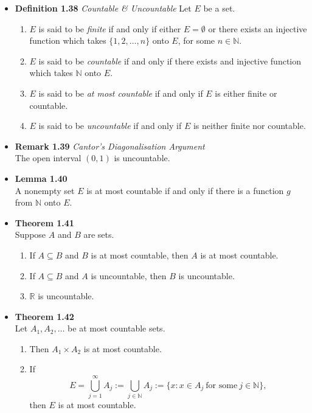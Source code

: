 \documentclass[11pt,a4paper]{article}
\begin{document}
\begin{itemize}
    \item \textbf{Definition 1.38} \emph{Countable & Uncountable}
        Let $E$ be a set.
        \begin{enumerate}
            \item $E$ is said to be \emph{finite} if and only if either $E = \emptyset$
                or there exists an injective function which takes
                $\{ 1, 2, \ldots, n \}$ onto $E$, for some $n \in \mathbb{N}$.
            \item $E$ is said to be \emph{countable} if and only if there exists and injective
                function which takes $\mathbb{N}$ onto $E$.
            \item $E$ is said to be \emph{at most countable} if and only if $E$ is either
                finite or countable.
            \item $E$ is said to be \emph{uncountable} if and only if $E$ is neither finite nor
                countable.
        \end{enumerate}

    \item \textbf{Remark 1.39} \emph{Cantor's Diagonalisation Argument} \\
        The open interval $(0, 1)$ is uncountable.

    \item \textbf{Lemma 1.40} \\
        A nonempty set $E$ is at most countable if and only if there is a function $g$ from
        $\mathbb{N}$ onto $E$.

    \item \textbf{Theorem 1.41} \\
        Suppose $A$ and $B$ are sets.
        \begin{enumerate}
            \item If $A \subseteq B$ and $B$ is at most countable, then $A$ is at most countable.
            \item If $A \subseteq B$ and $A$ is uncountable, then $B$ is uncountable.
            \item $\mathbb{R}$ is uncountable.
        \end{enumerate}

    \item \textbf{Theorem 1.42} \\
        Let $A_1, A_2, \ldots$ be at most countable sets.
        \begin{enumerate}
            \item Then $A_1 \times A_2$ is at most countable.
            \item If
                \[
                    E = \bigcup_{j=1}^\infty A_j :=
                    \bigcup_{j \in \mathbb{N}} A_j :=
                    \{ x : x \in A_j \ \text{for some} \ j \in \mathbb{N} \},
                \]
                then $E$ is at most countable.
        \end{enumerate}


\end{itemize}
\end{document}
